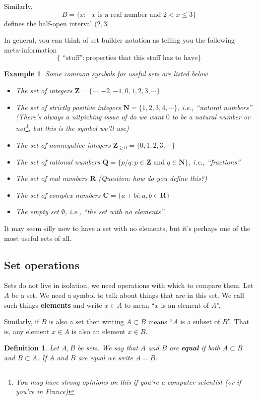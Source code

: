 \documentclass[12pt]{article}
\numberwithin{equation}{subsection}
\newtheorem{defn}[subsection]{Definition}
\theoremstyle{note}
\newtheorem{example}[subsection]{Example}
\begin{document}
Similarly, \[B=\{ x: \text{ $x$ is a real number and $2<x\leq 3$}\}\] defines the half-open interval $(2,3]$.

In general, you can think of set builder notation as telling you the following meta-information \[\{ \text{ ``stuff''} : \text{properties that this stuff has to have} \}\]

\begin{example} Some common symbols for useful sets are listed below
\begin{itemize}
	\item The set of integers $\mathbf{Z}=\{\cdots, -2, -1, 0, 1, 2, 3, \cdots\}$
	\item The set of strictly positive integers $\mathbf{N}=\{1,2,3,4,\cdots\}$, i.e.,  ``natural numbers'' (There's always a nitpicking issue of do we want $0$ to be a natural number or not\footnote{You may have strong opinions on this if you're a computer scientist (or if you're in France)}, but this is the symbol we'll use)
	\item The set of nonnegative integers $\mathbf{Z}_{\geq 0}=\{0,1,2,3,\cdots\}$
	\item The set of rational numbers $\mathbf{Q}=\{ p/q : p\in \mathbf{Z} \text{ and } q\in \mathbf{N} \}$, i.e., ``fractions''
	\item The set of real numbers $\mathbf{R}$ (\textit{Question: how do you define this?})
	\item The set of complex numbers $\mathbf{C}=\{ a+bi : a, b \in \mathbf{R}\}$
	\item The empty set $\emptyset$, i.e., ``the set with no elements'' 
\end{itemize}
\end{example} 
It may seem silly now to have a set with no elements, but it's perhaps one of the most useful sets of all. 

\subsection{Set operations} 
Sets do not live in isolation, we need operations with which to compare them. Let $A$ be a set. We need a symbol to talk about things that are in this set. We call such things \textbf{elements} and write $x\in A$ to mean ``$x$ is an element of $A$''. 

Similarly, if  $B$ is also a set then writing $A\subset B$ means ``$A$ is a subset of $B$''. That is, any element $x\in A$ is also an element $x\in B$. 

\begin{defn}
Let $A,B$ be sets. We say that $A$ and $B$ are \textbf{equal} if both $A\subset B$ and $B\subset A$. If $A$ and $B$ are equal we write $A=B$.
\end{defn}
\end{document}
